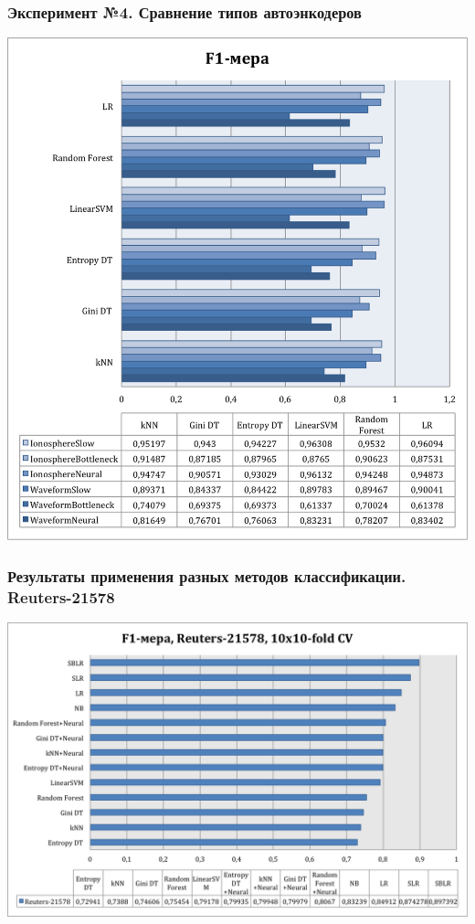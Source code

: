 \documentclass{beamer}
\begin{document}
\begin{frame}
\frametitle{Эксперимент №4. Сравнение типов автоэнкодеров}
\begin{center}
    \includegraphics[width=\linewidth,height=0.7\textheight,align=\center,trim=4 4 4 4, clip, keepaspectratio]{autoencoder-comparison.png}
\end{center}
\end{frame}

\begin{frame}
\frametitle{Результаты применения разных методов классификации. Reuters-21578}
\begin{center}
    \includegraphics[width=\linewidth,height=0.7\textheight,align=\center,trim=4 4 4 4, clip, keepaspectratio]{reuters-summary.png}
\end{center}
\end{frame}
\end{document}
